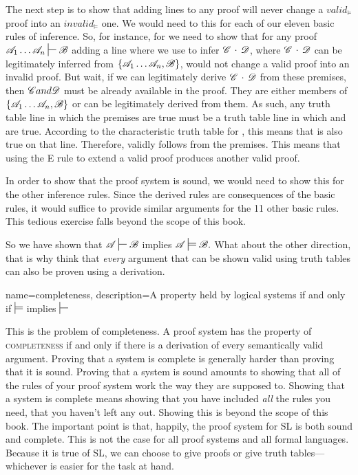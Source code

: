 {The next step is to show that adding lines to any proof will never change a $valid_{\models}$ proof into an $invalid_{\models}$ one. We would need to this for each of our eleven basic rules of inference. So, for instance, for  we need to show that for any proof $\script{A}_{1} \ldots{} \script{A}_{n} \sststile{}{} \script {B}$ adding a line where we use  to infer $\mathscr{C} \,\cdot\, \mathscr{D}$, where $\mathscr{C} \,\cdot\, \mathscr{D}$ can be legitimately inferred from $\{\mathscr{A}_{1} \ldots{} \mathscr{A}_{n}, \mathscr{B}\}$, would not change a valid proof into an invalid proof. But wait, if we can legitimately derive $\mathscr{C} \,\cdot\, \mathscr{D}$ from these premises, then $\mathscr{C} and \mathscr{D}$ must be already available in the proof. They are either members of  $\{\mathscr{A}_{1} \ldots{} \mathscr{A}_{n}, \mathscr{B}\}$ or can be legitimately derived from them. As such, any truth table line in which the premises are true must be a truth table line in which  and  are true. According to the characteristic truth table for \eand, this means that \eand{} is also true on that line. Therefore, \eand{} validly follows from the premises. This means that using the {\eand}E rule to extend a valid proof produces another valid proof.

In order to show that the proof system is sound, we would need to show this for the other inference rules. Since the derived rules are consequences of the basic rules, it would suffice to provide similar arguments for the 11 other basic rules. This tedious exercise falls beyond the scope of this book.

So we have shown that $\script{A} \sststile{}{} \script{B}$ implies $\script{A} \sdtstile{}{}\script{B}.$ What about the other direction, that is why think that \emph{every} argument that can be shown valid using truth tables can also be proven using a derivation. 

{
name=completeness,
description={A property held by logical systems if and only if $\sdtstile{}{}$ implies $\sststile{}{}$}
}

This is the problem of completeness. A proof system has the property of  \textsc{\gls{completeness}} \label{def:completeness} if and only if there is a derivation of every semantically valid argument. Proving that a system is complete is generally harder than proving that it is sound. Proving that a system is sound amounts to showing that all of the rules of your proof system work the way they are supposed to. Showing that a system is complete means showing that you have included \emph{all} the rules you need, that you haven't left any out. Showing this is beyond the scope of this book. The important point is that, happily, the proof system for SL is both sound and complete. This is not the case for all proof systems and all formal languages. Because it is true of SL, we can choose to give proofs or give truth tables---whichever is easier for the task at hand.

}
